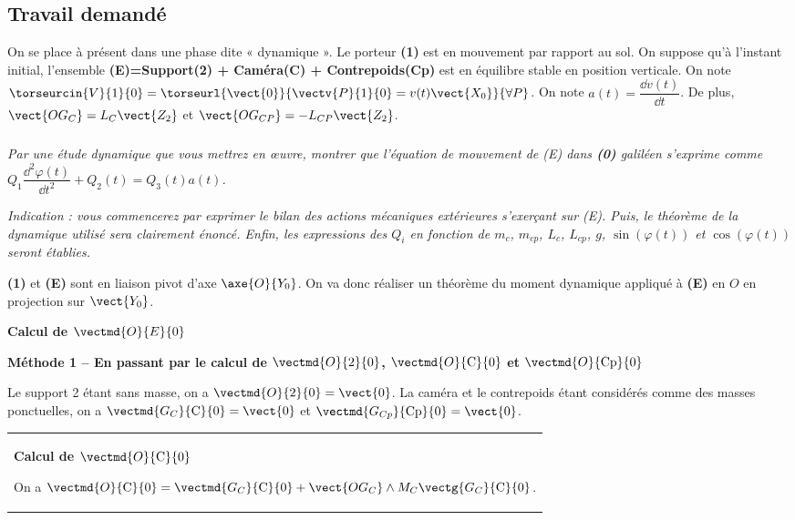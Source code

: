 \begin{multicols}{2}
\subsection*{Travail demandé}
\ifprof
\else
On se place à présent dans une phase dite « dynamique ». Le porteur \textbf{(1)} est en mouvement par rapport au sol. On suppose qu'à l'instant initial, l'ensemble \textbf{(E)=Support(2) + Caméra(C) + Contrepoids(Cp)} est en équilibre stable en position verticale. On note $\torseurcin{V}{1}{0}=\torseurl{\vect{0}}{\vectv{P}{1}{0}=v(t)\vect{X_0}}{\forall P}$.
On note $a(t)=\dfrac{\dd v(t)}{\dd t}$. De plus, $\vect{OG_C}=L_C\vect{Z_2}$ et $\vect{OG_{CP}}=-L_{CP}\vect{Z_2}$.
\fi

\subparagraph{}
\textit{Par une étude dynamique que vous mettrez en \oe{}uvre, montrer que l'équation de mouvement de (E)
dans \textbf{(0)} galiléen s'exprime comme $Q_1\dfrac{\dd^2\varphi(t) }{\dd t^2}+Q_2(t)=Q_3(t)a(t)$.}

\ifdifficile
\ifprof
\else
\textit{Indication : vous commencerez par exprimer le bilan des actions mécaniques extérieures s’exerçant sur (E). Puis,
le théorème de la dynamique utilisé sera clairement énoncé. Enfin, les expressions des $Q_i$ en fonction de $m_c$,
$m_{cp}$, $L_c$, $L_{cp}$, $g$, $\sin\left(\varphi(t)\right)$ et $\cos\left(\varphi(t)\right)$ seront établies.}
\fi

\else
\fi


\ifprof
\begin{corrige}
\textbf{(1)} et \textbf{(E)} sont en liaison pivot d'axe $\axe{O}{Y_0}$. On va donc réaliser un théorème du moment dynamique appliqué à \textbf{(E)} en $O$ en projection sur $\vect{Y_0}$. 

\textbf{Calcul de $\vectmd{O}{E}{0}$}

\textbf{Méthode 1 -- En passant par le calcul de $\vectmd{O}{\text{2}}{0}$, $\vectmd{O}{\text{C}}{0}$ et $\vectmd{O}{\text{Cp}}{0}$}


Le support 2 étant sans masse, on a $\vectmd{O}{\text{2}}{0}=\vect{0}$. La caméra et le contrepoids étant considérés comme des masses ponctuelles, on a $\vectmd{G_C}{\text{C}}{0}=\vect{0}$ et $\vectmd{G_{Cp}}{\text{Cp}}{0}=\vect{0}$.

 \begin{tabular}{|p{.9\linewidth}}
\textbf{Calcul de $\vectmd{O}{\text{C}}{0}$}

 On a $\vectmd{O}{\text{C}}{0} = \vectmd{G_{C}}{\text{C}}{0}+\vect{OG_C} \wedge M_C\vectg{G_{C}}{\text{C}}{0}$.
 

\end{tabular}
\end{corrige}
\end{multicols}
